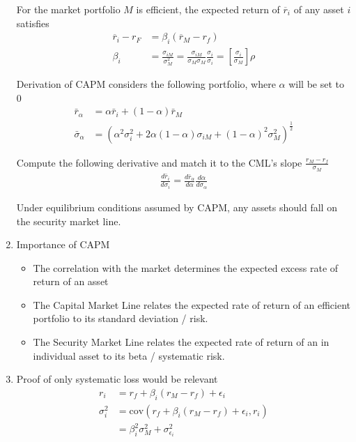 \documentclass[12pt,twoside]{article}
\begin{document}
\begin{enumerate}
	 For the market portfolio $M$ is efficient, the expected return of $\overline{r}_i$ of any asset $i$ satisfies
	 \begin{align*}
	 	\overline{r}_i - r_F &= \beta_i (\overline{r}_M-r_f)\\
	 	\beta_i &=\frac{\sigma_{iM}}{\sigma^2_M} = \frac{\sigma_{iM}}{\sigma_M\sigma_M}\frac{\sigma_i}{\sigma_i}= \left[\frac{\sigma_i}{\sigma_M}\right] \rho
	 \end{align*}
	 
	Derivation of CAPM considers the following portfolio, where $\alpha$ will be set to 0
	\begin{align*}
		\bar{r}_\alpha 			&= \alpha\bar{r}_i + (1-\alpha) \bar{r}_M\\
		\bar{\sigma}_\alpha	& = \left(\alpha^2 \sigma_i^2 +2\alpha (1-\alpha)\sigma_{iM} + (1-\alpha)^2 \sigma_M^2\right)^{\frac{1}{2}}
	\end{align*}		
		 
	 Compute the following derivative and match it to the CML's slope $\frac{r_M -r_f}{\sigma_M}$
	\begin{align*}
		\frac{d\bar{r}_i}{d\sigma_i}= \frac{d \bar{r}_\alpha}{d \alpha}\frac{d\alpha}{d \sigma_\alpha}
	\end{align*}
	 
	 Under equilibrium conditions assumed by CAPM, any assets should fall on the security market line.
	 
	 \item Importance of CAPM
	 	\begin{itemize}
	 		\item The correlation with the market determines the expected excess rate of return of an asset
	 		\item The Capital Market Line relates the expected rate of return of an efficient portfolio to its standard deviation / risk.
	 		\item The Security Market Line relates the expected rate of return of an in individual asset to its beta / systematic risk.
	 	\end{itemize}
	
	 \item Proof of only systematic loss would be relevant
	 \begin{align*}
	 	r_i 					& = r_f + \beta_i (r_M - r_f )+ \epsilon_i\\
	 	\sigma_{i}^2		& = \text{cov} \left(r_f + \beta_i (r_M - r_f )+ \epsilon_i, r_i\right)\\
	 							& = \beta_i^2 \sigma^2_M + \sigma_{\epsilon_i}^2
	 \end{align*}
 		

\end{enumerate}
\end{document}
